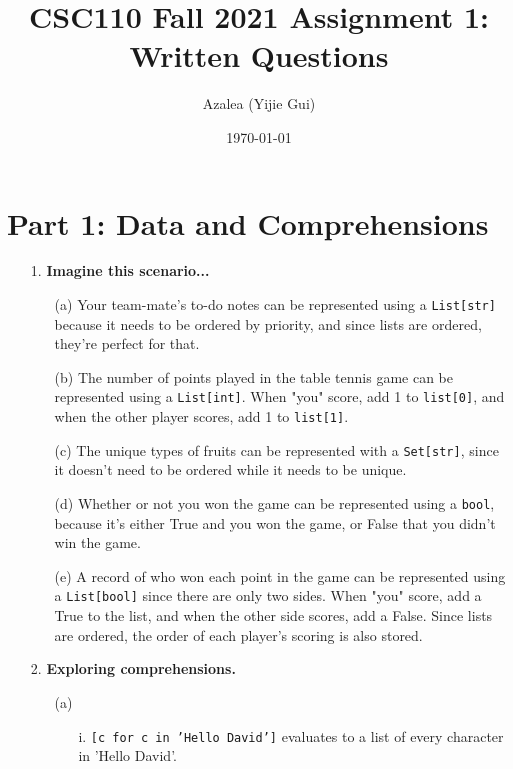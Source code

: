 \documentclass[fontsize=11pt]{article}
\title{CSC110 Fall 2021 Assignment 1: Written Questions}
\author{Azalea (Yijie Gui)}
\date{\today}
\begin{document}
    \maketitle

    \section*{Part 1: Data and Comprehensions}

    \begin{enumerate}
        \item[1.] \textbf{Imagine this scenario...}
        \begin{enumerate}
            \item[(a)]
            Your team-mate's to-do notes can be represented using a \texttt{List[str]} because it needs to be ordered by priority, and since lists are ordered, they're perfect for that.

            \item[(b)]
            The number of points played in the table tennis game can be represented using a \texttt{List[int]}. When "you" score, add 1 to \texttt{list[0]}, and when the other player scores, add 1 to \texttt{list[1]}.

            \item[(c)]
            The unique types of fruits can be represented with a \texttt{Set[str]}, since it doesn't need to be ordered while it needs to be unique.

            \item[(d)]
            Whether or not you won the game can be represented using a \texttt{bool}, because it's either True and you won the game, or False that you didn't win the game.

            \item[(e)]
            A record of who won each point in the game can be represented using a \texttt{List[bool]} since there are only two sides. When "you" score, add a True to the list, and when the other side scores, add a False. Since lists are ordered, the order of each player's scoring is also stored.

        \end{enumerate}

        \item[2.] \textbf{Exploring comprehensions.}

        \begin{enumerate}
            \item[(a)]
            \begin{enumerate}
                \item[i.] \texttt{[c for c in 'Hello David']} evaluates to a list of every character in 'Hello David'.


\end{enumerate}
\end{enumerate}
\end{enumerate}
\end{document}
